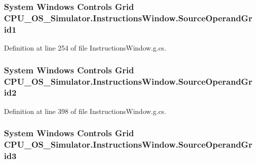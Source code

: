 \subsubsection[{Source\+Operand\+Grid1}]{\setlength{\rightskip}{0pt plus 5cm}System Windows Controls Grid C\+P\+U\+\_\+\+O\+S\+\_\+\+Simulator.\+Instructions\+Window.\+Source\+Operand\+Grid1\hspace{0.3cm}{\ttfamily [package]}}\label{class_c_p_u___o_s___simulator_1_1_instructions_window_a3f9d1afc4455fa6b06c6fab3cdb6aeec}


Definition at line 254 of file Instructions\+Window.\+g.\+cs.

\hypertarget{class_c_p_u___o_s___simulator_1_1_instructions_window_a715ed01337540f316f39fe42c373c602}{}
\subsubsection[{Source\+Operand\+Grid2}]{\setlength{\rightskip}{0pt plus 5cm}System Windows Controls Grid C\+P\+U\+\_\+\+O\+S\+\_\+\+Simulator.\+Instructions\+Window.\+Source\+Operand\+Grid2\hspace{0.3cm}{\ttfamily [package]}}\label{class_c_p_u___o_s___simulator_1_1_instructions_window_a715ed01337540f316f39fe42c373c602}


Definition at line 398 of file Instructions\+Window.\+g.\+cs.

\hypertarget{class_c_p_u___o_s___simulator_1_1_instructions_window_ab8409532df6419d7f7ce0c3450807906}{}
\subsubsection[{Source\+Operand\+Grid3}]{\setlength{\rightskip}{0pt plus 5cm}System Windows Controls Grid C\+P\+U\+\_\+\+O\+S\+\_\+\+Simulator.\+Instructions\+Window.\+Source\+Operand\+Grid3\hspace{0.3cm}{\ttfamily [package]}}\label{class_c_p_u___o_s___simulator_1_1_instructions_window_ab8409532df6419d7f7ce0c3450807906}


